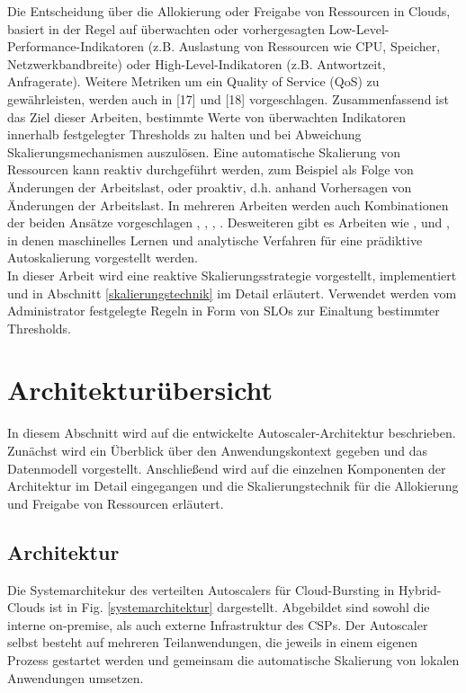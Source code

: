 \documentclass[runningheads]{llncs}
\begin{document}
Die Entscheidung über die Allokierung oder Freigabe von Ressourcen in Clouds, basiert in der Regel auf überwachten oder vorhergesagten Low-Level-Performance-Indikatoren (z.B. Auslastung von Ressourcen wie CPU, Speicher, Netzwerkbandbreite) oder High-Level-Indikatoren (z.B. Antwortzeit, Anfragerate). Weitere Metriken um ein Quality of Service (QoS) zu gewährleisten, werden auch in [17] und [18] vorgeschlagen. Zusammenfassend ist das Ziel dieser Arbeiten, bestimmte Werte von überwachten Indikatoren innerhalb  festgelegter Thresholds zu halten und bei Abweichung Skalierungsmechanismen auszulösen. Eine automatische Skalierung von Ressourcen kann reaktiv durchgeführt werden, zum Beispiel als Folge von Änderungen der Arbeitslast, oder proaktiv, d.h. anhand Vorhersagen von Änderungen der Arbeitslast. In mehreren Arbeiten werden auch Kombinationen der beiden Ansätze vorgeschlagen \cite{ali-eldin_adaptive_2012}, \cite{gandhi_adaptive_nodate}, \cite{fernandez_autoscaling_2014}, \cite{bouabdallah_use_2016}. Desweiteren gibt es Arbeiten wie \cite{moreno-vozmediano_efficient_2019}, \cite{iqbal_unsupervised_2016} und \cite{bu_reinforcement_2009}, in denen maschinelles Lernen und analytische Verfahren für eine prädiktive Autoskalierung vorgestellt werden. \\

In dieser Arbeit wird eine reaktive Skalierungsstrategie vorgestellt, implementiert und in Abschnitt \ref{skalierungstechnik} im Detail erläutert. Verwendet werden vom Administrator festgelegte Regeln in Form von SLOs zur Einaltung bestimmter Thresholds.  \\
	
\section{Architekturübersicht} \label{Architekturübersicht}
	
In diesem Abschnitt wird auf die entwickelte Autoscaler-Architektur beschrieben. Zunächst wird ein Überblick über den Anwendungskontext gegeben und das Datenmodell vorgestellt. Anschließend wird auf die einzelnen Komponenten der Architektur im Detail eingegangen und die Skalierungstechnik für die Allokierung und Freigabe von Ressourcen erläutert.
	
\subsection{Architektur}

Die Systemarchitekur des verteilten Autoscalers für Cloud-Bursting in Hybrid-Clouds ist in Fig. \ref{systemarchitektur} dargestellt. Abgebildet sind sowohl die interne on-premise, als auch externe Infrastruktur des CSPs. Der Autoscaler selbst besteht auf mehreren Teilanwendungen, die jeweils in einem eigenen Prozess gestartet werden und gemeinsam die automatische Skalierung von lokalen Anwendungen umsetzen.
	
\end{document}
